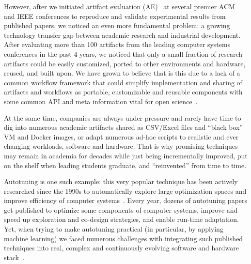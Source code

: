 However, after we initiated artifact evaluation (AE)~\cite{ctuning-ae1,childers2016artifact}
at several premier ACM and IEEE conferences to reproduce and validate experimental results 
from published papers, we noticed an even more
fundamental problem: a growing technology transfer gap between academic
research and industrial development.
%
After evaluating more than 100 artifacts from the leading computer systems conferences
in the past 4 years, we noticed that only a small fraction of research artifacts 
could be easily customized, ported to other environments and hardware, reused, 
and built upon.
%
We have grown to believe that is this due to a lack of a common workflow framework
that could simplify implementation and sharing of artifacts and workflows as
portable, customizable and reusable components with some common API and meta information
vital for open science~\cite{new_pub_model}.

At the same time, companies are always under pressure and rarely have time to
dig into numerous academic artifacts shared as CSV/Excel files
and ``black box'' VM and Docker images, or adapt numerous ad-hoc scripts 
to realistic and ever changing workloads, software and hardware.
%
That is why promising techniques may remain in academia for decades while just
being incrementally improved, put on the shelf when leading students graduate,
and ``reinvented'' from time to time.

Autotuning is one such example: this very popular technique has been actively
researched since the 1990s to automatically explore large optimization spaces
and improve efficiency of computer systems~\cite{atlas, fftw, CSS99, VE00,
FOK02, Tapus:2002:AHT:762761.762771, vista, spiral, LCYP04, la2004, PE2006,
Shende:2006:TPP:1125980.1125982, 1742-6596-125-1-012089,
DBLP:conf/ipps/HartonoNS09, 29db2248aba45e59:a31e374796869125, tnld10,
openbenchmarking, Ren:2010:GPC:1849301.1849332, Grauer-Gray2012-hn,
DBLP:conf/cgo/GreweWO13, Khan:2013:SAC:2400682.2400690, ansel:pact:2014,
DBLP:conf/sc/TsaiLKD16, DBLP:conf/supercomputer/AbdelfattahHTD16}.
%
Every year, dozens of autotuning papers get published to optimize some components
of computer systems, improve and speed up exploration and co-design strategies,
and enable run-time adaptation.
%
Yet, when trying to make autotuning practical (in particular, by applying
machine learning) we faced numerous challenges with integrating such published
techniques into real, complex and continuously evolving software and hardware
stack~\cite{Fur2009,fursin:hal-01054763,cm:29db2248aba45e59:cd11e3a188574d80,new_pub_model}.

